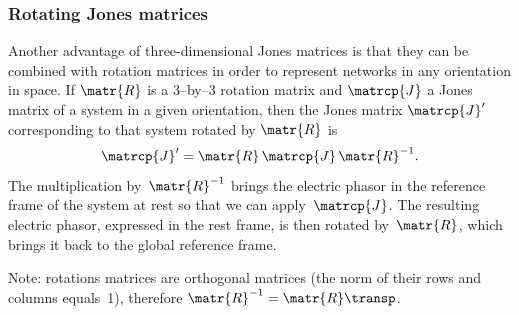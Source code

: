 \subsubsection{Rotating Jones matrices}
\label{sec:rotating_jones_matrices}

Another advantage of three-dimensional Jones matrices is that they can be combined with rotation matrices in order to represent networks in any orientation in space.
If $\matr{R}$ is a 3--by--3 rotation matrix and $\matrcp{J}$ a Jones matrix of a system in a given orientation,
then the Jones matrix $\matrcp{J}'$ corresponding to that system rotated by $\matr{R}$ is
\begin{equation}
    \matrcp{J}' = \matr{R} \, \matrcp{J} \, \matr{R}^{-1}
    \text{.}
    \label{eq:jones_rotation_using_inverse}
\end{equation}
The multiplication by~$\matr{R}^{-1}$ brings the electric phasor in the reference frame of the system at rest so that we can apply~$\matrcp{J}$.
The resulting electric phasor, expressed in the rest frame, is then rotated by~$\matr{R}$, which brings it back to the global reference frame.

Note: rotations matrices are orthogonal matrices (the norm of their rows and columns equals~1), therefore $\matr{R}^{-1} = \matr{R}\transp$.



